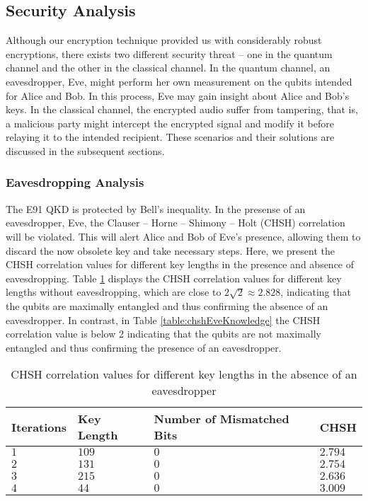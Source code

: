 \documentclass{article}
\begin{document}
\subsection{Security Analysis}
Although our encryption technique provided us with considerably robust encryptions, there exists two different security threat -- one in the quantum channel and the other in the classical channel. In the quantum channel, an eavesdropper, Eve, might perform her own measurement on the qubits intended for Alice and Bob. In this process, Eve may gain insight about Alice and Bob's keys. In the classical channel, the encrypted audio suffer from tampering, that is, a malicious party might intercept the encrypted signal and modify it before relaying it to the intended recipient. These scenarios and their solutions are discussed in the subsequent sections.
\subsubsection{Eavesdropping Analysis}
The E91 QKD is protected by Bell's inequality. In the presense of an eavesdropper, Eve, the Clauser -- Horne -- Shimony -- Holt (CHSH) correlation \cite{PhysRevLett.23.880} will be violated. This will alert Alice and Bob of Eve's presence, allowing them to discard the now obsolete key and take necessary steps. Here, we present the CHSH correlation values for different key lengths in the presence and absence of eavesdropping. Table \ref{table:chsheRsults} displays the CHSH correlation values for different key lengths without eavesdropping, which are close to $2\sqrt{2} \approx 2.828$, indicating that the qubits are maximally entangled and thus confirming the absence of an eavesdropper. In contrast, in Table \ref{table:chshEveKnowledge} the CHSH correlation value is below 2 indicating that the qubits are not maximally entangled and thus confirming the presence of an eavesdropper.
\begin{table}[!h]
    \begin{center}
        \caption{CHSH correlation values for different key lengths in the absence of an eavesdropper}
        \begin{tabularx}{\textwidth}{>{\centering\arraybackslash}X>{\centering\arraybackslash}X>{\centering\arraybackslash}X>{\centering\arraybackslash}X}
            \hline
            Iterations & Key Length & Number of Mismatched Bits & CHSH    \\ \hline
            $1$        & $109$      & $0$                       & $2.794$ \\
            $2$        & $131$      & $0$                       & $2.754$ \\
            $3$        & $215$      & $0$                       & $2.636$ \\
            $4$        & $44$       & $0$                       & $3.009$ \\
            \hline
        \end{tabularx}
        \label{table:chsheRsults}
    \end{center}
\end{table}
\end{document}
